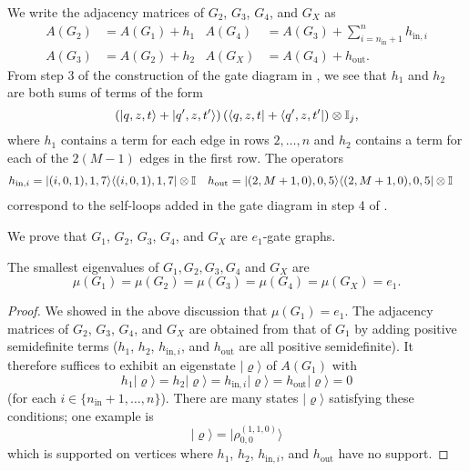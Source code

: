 \documentclass[../thesis-main/thesis-main]{subfiles}
\begin{document}
We write the adjacency matrices of $G_{2}$, $G_{3}$, $G_{4}$, and $G_X$ as 
\begin{align}
  A(G_{2}) &= A(G_{1})+h_{1} & 
  A(G_{4}) &= A(G_{3})+\sum_{i=n_{\text{in}}+1}^{n}h_{\text{in},i} \\
  A(G_{3}) &= A(G_{2})+h_{2} &
  A(G_X)   &= A(G_{4})+h_{\text{out}}.
\end{align}
From step 3 of the construction of the gate diagram in , we see that $h_{1}$ and $h_{2}$ are both sums of terms of the form 
\begin{equation}
  \left(|q,z,t\rangle+|q^{\prime},z,t^{\prime}\rangle\right)
  \left(\langle q,z,t|+\langle q^{\prime},z,t^{\prime}|\right)\otimes\mathbb{I}_{j},
\end{equation}
where $h_1$ contains a term for each edge in rows $2,\ldots, n$ and $h_2$ contains a term for each of the $2(M-1)$ edges in the first row. The operators
\begin{align}
  h_{\mathrm{in},i} &= |(i,0,1),1,7\rangle\langle(i,0,1),1,7|\otimes\mathbb{I} &
  h_{\text{out}} &= |(2,M+1,0),0,5\rangle\langle(2,M+1,0),0,5|\otimes\mathbb{I}
\label{eq:hin_i}
\end{align}
correspond to the self-loops added in the gate diagram in step 4 of . 

We prove that $G_1$, $G_2$, $G_3$, $G_4$, and $G_X$ are $e_1$-gate graphs.

\begin{lemma}
\label{lem:The-smallest-eigenvalues}The smallest eigenvalues of $G_{1},G_{2},G_{3},G_{4}$
and $G_X$ are 
\begin{equation}
\mu(G_{1})=\mu(G_{2})=\mu(G_{3})=\mu(G_{4})=\mu(G_X)=e_{1}.
\end{equation}
\end{lemma}

\begin{proof}
We showed in the above discussion that $\mu(G_{1})=e_{1}$. The adjacency matrices of $G_{2}$, $G_{3}$, $G_{4}$, and $G_X$ are obtained from that of $G_{1}$ by adding positive semidefinite terms ($h_{1}$, $h_{2}$, $h_{\text{in},i}$, and $h_{\text{out}}$ are all positive semidefinite). It therefore suffices to exhibit an eigenstate $|\varrho\rangle$ of $A(G_{1})$ with
\begin{equation}
  h_{1}|\varrho\rangle
  =h_{2}|\varrho\rangle
  =h_{\text{in},i}|\varrho\rangle
  =h_{\text{out}}|\varrho\rangle
  =0
\end{equation}
(for each $i\in\{n_{\text{in}}+1,\ldots,n\}$). There are many states $|\varrho\rangle$ satisfying these conditions; one example is
\begin{equation}
|\varrho\rangle = |\rho_{0,0}^{(1,1,0)}\rangle
\end{equation}
which is supported on vertices where $h_{1}$, $h_{2}$, $h_{\text{in},i}$, and $h_{\text{out}}$ have no support.
\end{proof}
\end{document}
